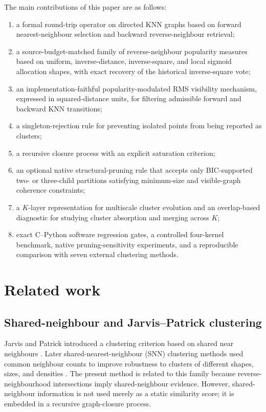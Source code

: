 \documentclass[pdflatex,sn-mathphys-num]{sn-jnl}
\begin{document}
The main contributions of this paper are as follows:
\begin{enumerate}
\item a formal round-trip operator on directed KNN graphs based on forward nearest-neighbour selection and backward reverse-neighbour retrieval;
\item a source-budget-matched family of reverse-neighbour popularity measures based on uniform, inverse-distance, inverse-square, and local sigmoid allocation shapes, with exact recovery of the historical inverse-square vote;
\item an implementation-faithful popularity-modulated RMS visibility mechanism, expressed in squared-distance units, for filtering admissible forward and backward KNN transitions;
\item a singleton-rejection rule for preventing isolated points from being reported as clusters;
\item a recursive closure process with an explicit saturation criterion;
\item an optional native structural-pruning rule that accepts only BIC-supported two- or three-child partitions satisfying minimum-size and visible-graph coherence constraints;
\item a $K$-layer representation for multiscale cluster evolution and an overlap-based diagnostic for studying cluster absorption and merging across $K$;
\item exact C--Python software regression gates, a controlled four-kernel benchmark, native pruning-sensitivity experiments, and a reproducible comparison with seven external clustering methods.
\end{enumerate}

\section{Related work}\label{sec:related}

\subsection{Shared-neighbour and Jarvis--Patrick clustering}

Jarvis and Patrick introduced a clustering criterion based on shared near neighbours \citep{JarvisPatrick1973}. Later shared-nearest-neighbour (SNN) clustering methods used common neighbour counts to improve robustness to clusters of different shapes, sizes, and densities \citep{Ertoz2003SNN}. The present method is related to this family because reverse-neighbourhood intersections imply shared-neighbour evidence. However, shared-neighbour information is not used merely as a static similarity score; it is embedded in a recursive graph-closure process.
\end{document}
